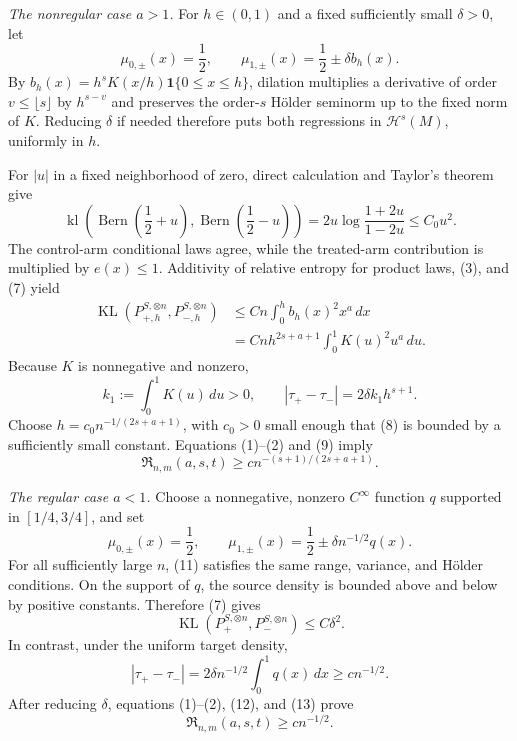 \emph{The nonregular case \(a>1\).}
For \(h\in(0,1)\) and a fixed sufficiently small \(\delta>0\), let
\[
 \mu_{0,\pm}(x)=\frac12,
 \qquad
 \mu_{1,\pm}(x)=\frac12\pm\delta b_h(x).
\tag{6}
\]
By \(b_h(x)=h^sK(x/h)\mathbf 1\{0\le x\le h\}\), dilation multiplies a derivative of order \(v\le\lfloor s\rfloor\) by \(h^{s-v}\) and preserves the order-\(s\) H\"older seminorm up to the fixed norm of \(K\). Reducing \(\delta\) if needed therefore puts both regressions in \(\mathcal H^s(M)\), uniformly in \(h\).

For \(|u|\) in a fixed neighborhood of zero, direct calculation and Taylor's theorem give
\[
 \operatorname{kl}\!\left(
  \operatorname{Bern}\left(\frac12+u\right),
  \operatorname{Bern}\left(\frac12-u\right)
 \right)
 =2u\log\frac{1+2u}{1-2u}
 \le C_0u^2.
\tag{7}
\]
The control-arm conditional laws agree, while the treated-arm contribution is multiplied by \(e(x)\le1\). Additivity of relative entropy for product laws, (3), and (7) yield
\[
 \begin{aligned}
 \operatorname{KL}(P_{+,h}^{S,\otimes n},P_{-,h}^{S,\otimes n})
 &\le Cn\int_0^h b_h(x)^2x^a\,dx\\
 &=Cnh^{2s+a+1}\int_0^1K(u)^2u^a\,du.
 \end{aligned}
\tag{8}
\]
Because \(K\) is nonnegative and nonzero,
\[
 k_1:=\int_0^1K(u)\,du>0,
 \qquad
 |\tau_+-\tau_-|=2\delta k_1h^{s+1}.
\tag{9}
\]
Choose \(h=c_0n^{-1/(2s+a+1)}\), with \(c_0>0\) small enough that (8) is bounded by a sufficiently small constant. Equations (1)--(2) and (9) imply
\[
 \mathfrak R_{n,m}(a,s,t)
 \ge c n^{-(s+1)/(2s+a+1)}.
\tag{10}
\]

\emph{The regular case \(a<1\).}
Choose a nonnegative, nonzero \(C^\infty\) function \(q\) supported in \([1/4,3/4]\), and set
\[
 \mu_{0,\pm}(x)=\frac12,
 \qquad
 \mu_{1,\pm}(x)=\frac12\pm\delta n^{-1/2}q(x).
\tag{11}
\]
For all sufficiently large \(n\), (11) satisfies the same range, variance, and H\"older conditions. On the support of \(q\), the source density is bounded above and below by positive constants. Therefore (7) gives
\[
 \operatorname{KL}(P_+^{S,\otimes n},P_-^{S,\otimes n})
 \le C\delta^2.
\tag{12}
\]
In contrast, under the uniform target density,
\[
 |\tau_+-\tau_-|
 =2\delta n^{-1/2}\int_0^1q(x)\,dx
 \ge c n^{-1/2}.
\tag{13}
\]
After reducing \(\delta\), equations (1)--(2), (12), and (13) prove
\[
 \mathfrak R_{n,m}(a,s,t)\ge c n^{-1/2}.
\tag{14}
\]

